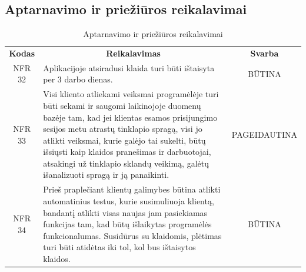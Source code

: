 \documentclass{VUMIFPSkursinis}
\begin{document}
\subsection{Aptarnavimo ir priežiūros reikalavimai}
\begin{center}
	\begin{table}[H]
	\caption{Aptarnavimo ir priežiūros reikalavimai}
	\begin{tabular}{|p{2cm}|p{}|p{}|}
	\hline
	    \rowcolor{lightgray}
		\multicolumn{3}{|c|}{Aptarnavimo ir priežiūros reikalavimai}\\
		
	\hline
		\multicolumn{1}{|c|}{{\bfseries Kodas}}&
		\multicolumn{1}{|c|}{{\bfseries Reikalavimas}}&
		\multicolumn{1}{|c|}{{\bfseries Svarba}}\\
	\hline 	
		\multicolumn{1}{|c|}{NFR 32}&
		{Aplikacijoje atsiradusi klaida turi būti ištaisyta per 3 darbo dienas.}&
		\multicolumn{1}{|c|}{BŪTINA}\\	
	
	\hline 	
		\multicolumn{1}{|c|}{NFR 33}&
		{Visi kliento atliekami veiksmai programėlėje turi būti sekami ir saugomi laikinojoje duomenų bazėje tam, kad jei klientas esamos prisijungimo sesijos metu atrastų tinklapio spragą, visi jo atlikti veiksmai, kurie galėjo tai sukelti, būtų išsiųsti kaip klaidos pranešimas ir darbuotojai, atsakingi už tinklapio sklandų veikimą, galėtų išanalizuoti spragą ir ją panaikinti.}&
		\multicolumn{1}{|p{1.5cm}|}{PAGEIDAUTINA}\\
	
	\hline 	
		\multicolumn{1}{|c|}{NFR 34}&
		{Prieš praplečiant klientų galimybes būtina atlikti automatinius testus, kurie susimuliuoja klientą, bandantį atlikti visas naujas jam pasiekiamas funkcijas tam, kad būtų išlaikytas programėlės funkcionalumas. Susidūrus su klaidomis, plėtimas turi būti atidėtas iki tol, kol bus ištaisytos klaidos.}&
		\multicolumn{1}{|c|}{BŪTINA}\\	
		
	\hline 	
	
	\end{tabular}
	
	\label{table:Aptarnavimoirpriežiūrosreikalavimai}
	\end{table}

\end{center}
\end{document}
